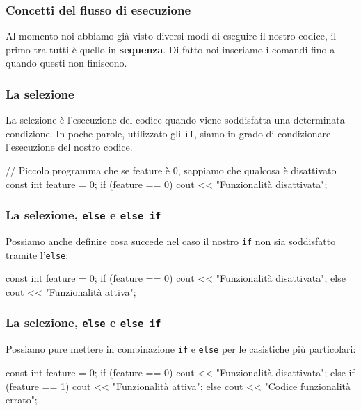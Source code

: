 \documentclass{beamer}
\begin{document}
    \begin{frame}
        \frametitle{Concetti del flusso di esecuzione}
        Al momento noi abbiamo già visto diversi modi di eseguire il nostro codice, il primo tra tutti è quello in \textbf{sequenza}. Di fatto noi inseriamo i comandi fino a quando questi non finiscono.
    \end{frame}

    \begin{frame}[fragile]
        \frametitle{La selezione}
        La selezione è l'esecuzione del codice quando viene soddisfatta una determinata condizione. In poche parole, utilizzato gli \texttt{if}, siamo in grado di condizionare l'esecuzione del nostro codice.
        \begin{cppcode}
            // Piccolo programma che se feature è 0, sappiamo che qualcosa è disattivato
            const int feature = 0;
            if (feature == 0) {
                cout << "Funzionalità disattivata";
            }
        \end{cppcode}
    \end{frame}

    \begin{frame}[fragile]
        \frametitle{La selezione, \texttt{else} e \texttt{else if}}
        Possiamo anche definire cosa succede nel caso il nostro \texttt{if} non sia soddisfatto tramite l'\texttt{else}:
        \begin{cppcode}
            const int feature = 0;
            if (feature == 0) {
                cout << "Funzionalità disattivata";
            } else {
                cout << "Funzionalità attiva";
            }
        \end{cppcode}
    \end{frame}

    \begin{frame}[fragile]
        \frametitle{La selezione, \texttt{else} e \texttt{else if}}
        Possiamo pure mettere in combinazione \texttt{if} e \texttt{else} per le casistiche più particolari:
        \begin{cppcode}
            const int feature = 0;
            if (feature == 0) {
                cout << "Funzionalità disattivata";
            } else if (feature == 1) {
                cout << "Funzionalità attiva";
            } else {
                cout << "Codice funzionalità errato";
            }
        \end{cppcode}
    \end{frame}
\end{document}
